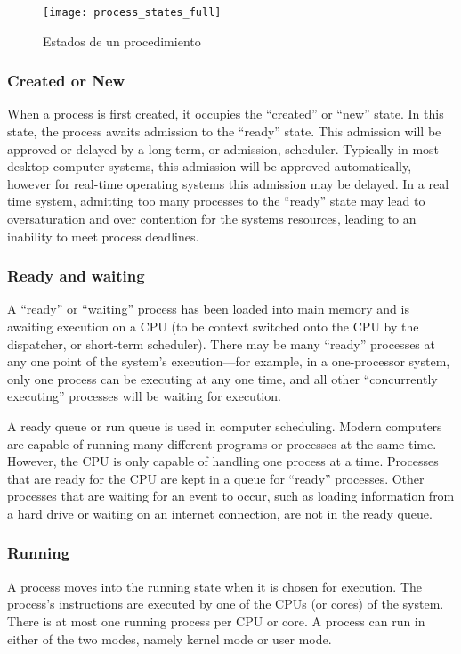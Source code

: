 \documentclass[a4paper, twoside]{article}
\begin{document}
\begin{figure}[h]
  \centering
  \texttt{[image: process\_states\_full]}
  \caption{Estados de un procedimiento}
  \label{fig:process_states_full}
\end{figure}

\subsubsection{Created or New}
When a process is first created, it occupies the ``created'' or ``new'' state.
In this state, the process awaits admission to the ``ready'' state.
This admission will be approved or delayed by a long-term, or admission,
scheduler.
Typically in most desktop computer systems, this admission will be approved
automatically, however for real-time operating systems this admission may be
delayed.
In a real time system, admitting too many processes to the ``ready'' state may
lead to oversaturation and over contention for the systems resources, leading
to an inability to meet process deadlines.

\subsubsection{Ready and waiting}

A ``ready'' or ``waiting'' process has been loaded into main memory and is
awaiting execution on a CPU (to be context switched onto the CPU by the
dispatcher, or short-term scheduler).
There may be many ``ready'' processes at any one point of the system's
execution—for example, in a one-processor system, only one process can be
executing at any one time, and all other ``concurrently executing'' processes
will be waiting for execution.

A ready queue or run queue is used in computer scheduling.
Modern computers are capable of running many different programs or processes at
the same time.
However, the CPU is only capable of handling one process at a time.
Processes that are ready for the CPU are kept in a queue for ``ready''
processes.
Other processes that are waiting for an event to occur, such as loading
information from a hard drive or waiting on an internet connection,
are not in the ready queue.

\subsubsection{Running}

A process moves into the running state when it is chosen for execution.
The process's instructions are executed by one of the CPUs (or cores) of the
system.
There is at most one running process per CPU or core.
A process can run in either of the two modes, namely kernel mode or user mode.
\end{document}
